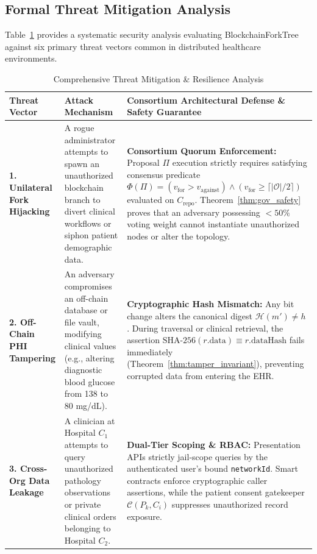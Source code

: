 \subsection{Formal Threat Mitigation Analysis}
Table~\ref{tab:threat_mitigation} provides a systematic security analysis evaluating BlockchainForkTree against six primary threat vectors common in distributed healthcare environments.

\begin{table}[t]
\centering
\caption{Comprehensive Threat Mitigation \& Resilience Analysis}
\label{tab:threat_mitigation}
\footnotesize
\setlength{\tabcolsep}{3pt}
\begin{tabularx}{\textwidth}{p{3.2cm}p{4.4cm}X}
\toprule
\textbf{Threat Vector} & \textbf{Attack Mechanism} & \textbf{Consortium Architectural Defense \& Safety Guarantee} \\
\midrule
\textbf{1. Unilateral Fork Hijacking} & A rogue administrator attempts to spawn an unauthorized blockchain branch to divert clinical workflows or siphon patient demographic data. & \textbf{Consortium Quorum Enforcement:} Proposal $\Pi$ execution strictly requires satisfying consensus predicate $\Phi(\Pi) = (v_{\text{for}} > v_{\text{against}}) \land (v_{\text{for}} \ge \lceil |\mathcal{O}|/2 \rceil)$ evaluated on $C_{\text{repo}}$. Theorem~\ref{thm:gov_safety} proves that an adversary possessing $< 50\%$ voting weight cannot instantiate unauthorized nodes or alter the topology. \\
\addlinespace
\textbf{2. Off-Chain PHI Tampering} & An adversary compromises an off-chain database or file vault, modifying clinical values (e.g., altering diagnostic blood glucose from 138 to 80 mg/dL). & \textbf{Cryptographic Hash Mismatch:} Any bit change alters the canonical digest $\mathcal{H}(m') \neq h$. During traversal or clinical retrieval, the assertion $\text{SHA-256}(r.\text{data}) \equiv r.\text{dataHash}$ fails immediately (Theorem~\ref{thm:tamper_invariant}), preventing corrupted data from entering the EHR. \\
\addlinespace
\textbf{3. Cross-Org Data Leakage} & A clinician at Hospital $C_1$ attempts to query unauthorized pathology observations or private clinical orders belonging to Hospital $C_2$. & \textbf{Dual-Tier Scoping \& RBAC:} Presentation APIs strictly jail-scope queries by the authenticated user's bound \texttt{networkId}. Smart contracts enforce cryptographic caller assertions, while the patient consent gatekeeper $\mathcal{C}(P_k, C_i)$ suppresses unauthorized record exposure. \\

\end{tabularx}
\end{table}
